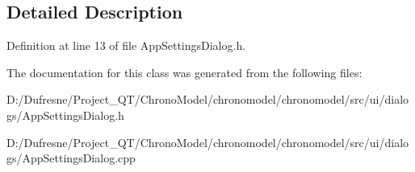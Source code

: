 \subsection{Detailed Description}


Definition at line 13 of file App\-Settings\-Dialog.\-h.



The documentation for this class was generated from the following files\-:\begin{DoxyCompactItemize}
\item 
D\-:/\-Dufresne/\-Project\-\_\-\-Q\-T/\-Chrono\-Model/chronomodel/chronomodel/src/ui/dialogs/App\-Settings\-Dialog.\-h\item 
D\-:/\-Dufresne/\-Project\-\_\-\-Q\-T/\-Chrono\-Model/chronomodel/chronomodel/src/ui/dialogs/App\-Settings\-Dialog.\-cpp\end{DoxyCompactItemize}
